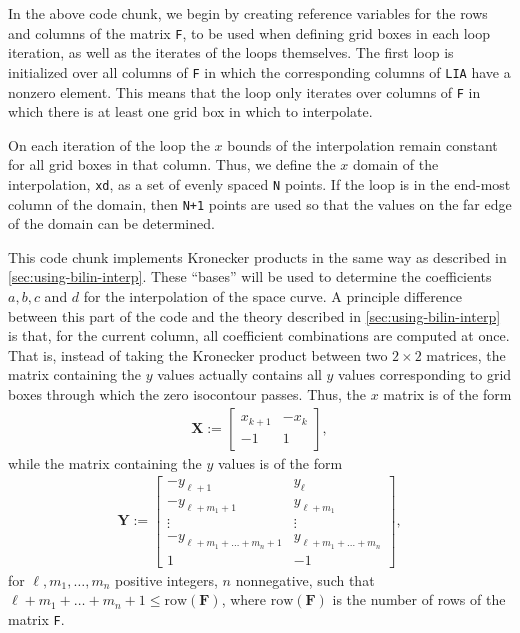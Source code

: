 \documentclass{article}
\begin{document}
\clearpage

\lstellipsisbelow

In the above code chunk, we begin by creating reference variables
for the rows and columns of the matrix \texttt{F}, to be used when
defining grid boxes in each loop iteration, as well as the
iterates of the loops themselves. The first loop is initialized
over all columns of \texttt{F} in which the corresponding columns
of \texttt{LIA} have a nonzero element. This means that the loop
only iterates over columns of \texttt{F} in which there is at
least one grid box in which to interpolate. 

On each iteration of the loop the $x$ bounds of the interpolation
remain constant for all grid boxes in that column. Thus, we define
the $x$ domain of the interpolation, \texttt{xd}, as a set of
evenly spaced \texttt{N} points. If the loop is in the end-most
column of the domain, then \texttt{N+1} points are used so that
the values on the far edge of the domain can be determined. 



This code chunk implements Kronecker products in the same way as
described in \autoref{sec:using-bilin-interp}. These ``bases''
will be used to determine the coefficients $a, b, c$ and $d$ for
the interpolation of the space curve. A principle difference
between this part of the code and the theory described in
\autoref{sec:using-bilin-interp} is that, for the current column,
all coefficient combinations are computed at once. That is,
instead of taking the Kronecker product between two $2\times 2$
matrices, the matrix containing the $y$ values actually contains
all $y$ values corresponding to grid boxes through which the zero
isocontour passes. Thus, the $x$ matrix is of the form
\begin{align*}
  \mathbf{X} := \left[
    \begin{array}{rr}
      x_{k+1} & -x_k\\
      -1 & 1
    \end{array}
\right],
\end{align*}
while the matrix containing the $y$ values is of the form
\begin{align*}
  \mathbf{Y} := \left[
    \begin{array}{rr}
      -y_{\ell+1} & y_\ell\\
      -y_{\ell+m_1+1} & y_{\ell + m_1}\\
      \vdots & \vdots \\
      -y_{\ell+m_1+\ldots+m_n+1} & y_{\ell + m_1 + \ldots + m_n}\\
      1 & -1
    \end{array}
\right],
\end{align*}
for $\ell, m_1, \ldots, m_n$ positive integers, $n$ nonnegative,
such that $\ell+ m_1 + \ldots + m_n+1 \leq
\mathrm{row}(\mathbf{F})$, where $\mathrm{row}(\mathbf{F})$ is the
number of rows of the matrix \texttt{F}.
\end{document}
